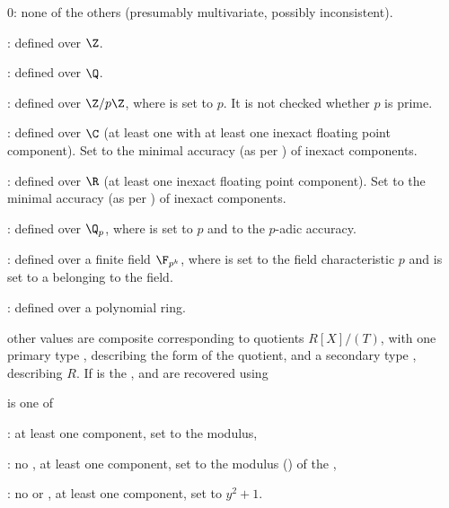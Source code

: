 \item 0: none of the others (presumably multivariate, possibly inconsistent).

\item {}: defined over $\Z$.

\item {}: defined over $\Q$.

\item {}: defined over $\Z/p\Z$, where  is set to $p$.
It is not checked whether $p$ is prime.

\item {}: defined over $\C$ (at least one  with at
least one inexact floating point  component). Set 
to the minimal accuracy (as per ) of inexact components.

\item {}: defined over $\R$ (at least one inexact floating point
 component). Set  to the minimal accuracy (as per
) of inexact components.

\item {}: defined over $\Q_p$, where  is set to $p$ and
 to the $p$-adic accuracy.

\item {}: defined over a finite field $\F_{p^k}$, where 
is set to the field characteristic $p$ and  is set to a
 belonging to the field.

\item {}: defined over a polynomial ring.

\item other values are composite corresponding to quotients $R[X]/(T)$, with
one primary type , describing the form of the quotient,
and a secondary type , describing $R$. If  is the
,  and  are recovered using


 is one of

: at least one  component,
set  to the modulus,

: no , at least one  component,
set  to the modulus () of the ,

: no  or , at least one 
component, set  to $y^2 + 1$.

